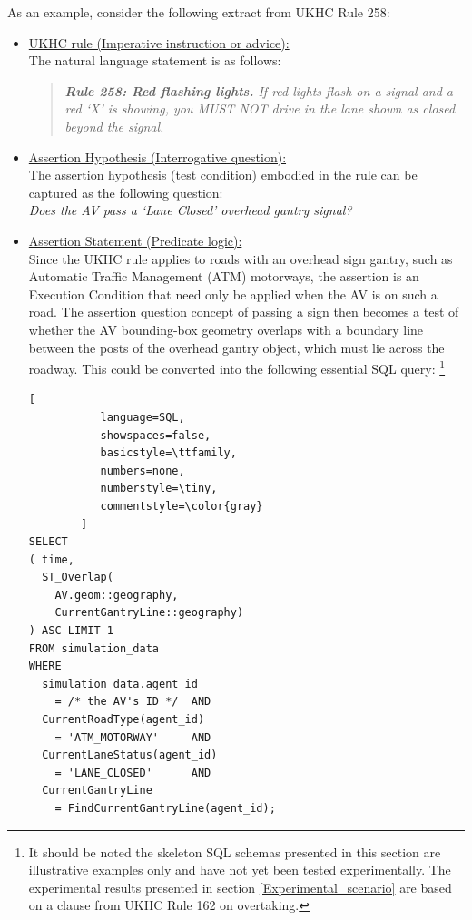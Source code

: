 As an example, consider the following extract from UKHC Rule 258:
\\
\begin{itemize}
    \item \underline{UKHC rule (Imperative instruction or advice):}\\
        The natural language statement is as follows:
        \vspace{2mm}
        \begin{quote}
            \textit{\textbf{Rule 258: Red flashing lights.} If red lights flash on a signal and a red `X' is showing, you MUST NOT drive in the lane shown as closed beyond the signal.}\\
        \end{quote}
        \vspace{2mm}
    \item \underline{Assertion Hypothesis (Interrogative question):}\\
        The assertion hypothesis (test condition) embodied in the rule can be captured as the following question:\\
        \vspace{2mm}
        \emph{Does the AV pass a `Lane Closed’ overhead gantry signal?}
        \vspace{2mm}
        
    \item \underline{Assertion Statement (Predicate logic):}\\
        Since the UKHC rule applies to roads with an overhead sign gantry, such as Automatic Traffic Management (ATM) motorways, the assertion is an Execution Condition that need only be applied when the AV is on such a road. The assertion question concept of passing a sign then becomes a test of whether the AV bounding-box geometry overlaps with a boundary line between the posts of the overhead gantry object, which must lie across the roadway. This could be converted into the following essential SQL query: \footnote{It should be noted the skeleton SQL schemas presented in this section are illustrative examples only and have not yet been tested experimentally. The experimental results presented in section \ref{Experimental_scenario} are based on a clause from UKHC Rule 162 on overtaking.}\\
    
\begin{lstlisting}[
           language=SQL,
           showspaces=false,
           basicstyle=\ttfamily,
           numbers=none,
           numberstyle=\tiny,
           commentstyle=\color{gray}
        ]
SELECT
( time,
  ST_Overlap(
    AV.geom::geography,
    CurrentGantryLine::geography)
) ASC LIMIT 1
FROM simulation_data
WHERE
  simulation_data.agent_id
    = /* the AV's ID */  AND
  CurrentRoadType(agent_id)
    = 'ATM_MOTORWAY'     AND
  CurrentLaneStatus(agent_id)
    = 'LANE_CLOSED'      AND
  CurrentGantryLine
    = FindCurrentGantryLine(agent_id);
\end{lstlisting} 
    

\end{itemize}
